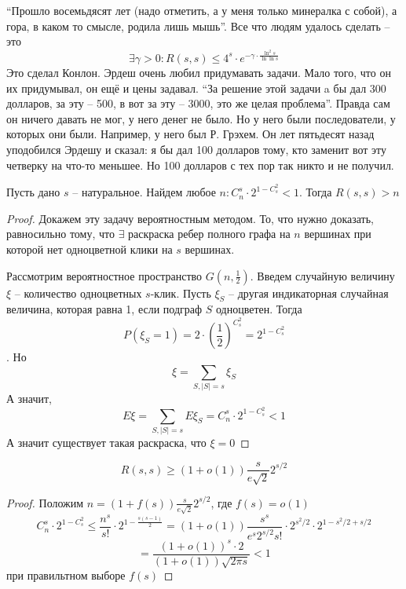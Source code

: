 \documentclass[document.tex]{subfiles}
\begin{document}
\begin{remark}
	``Прошло восемьдясят лет (надо отметить, а у меня только минералка с собой), а гора, в каком то смысле, родила лишь мышь''. Все что людям удалось сделать -- это $$\exists \gamma > 0 : R(s, s) \leq 4^s \cdot e^{-\gamma \cdot \frac{\ln^2 s}{\ln \ln s}}$$ Это сделал Конлон. Эрдеш очень любил придумавать задачи. Мало того, что он их придумывал, он ещё и цены задавал. ``За решение этой задачи a бы дал 300 долларов, за эту -- 500, в вот за эту -- 3000, это же целая проблема''. Правда сам он ничего давать не мог, у него денег не было. Но у него были последователи, у которых они были. Например, у него был Р. Грэхем. Он лет пятьдесят назад уподобился Эрдешу и сказал: я бы дал 100 долларов тому, кто заменит вот эту четверку на что-то меньшее. Но 100 долларов с тех пор так никто и не получил.
\end{remark}

\begin{theorem}
	Пусть дано $s$ -- натуральное. Найдем любое $\displaystyle n: C^s_n \cdot 2^{1-C_s^2} < 1$. Тогда $R(s, s) > n$
\end{theorem}

\begin{proof}
	Докажем эту задачу вероятностным методом. То, что нужно доказать, равносильно тому, что $\exists$ раскраска ребер полного графа на $n$ вершинах при которой нет одноцветной клики на $s$ вершинах.

	Рассмотрим вероятностное пространство $G(n, \frac{1}{2})$. 
	Введем случайную величину $\xi$ -- количество одноцветных $s$-клик. Пусть $\xi_S$ -- другая индикаторная случайная величина, которая равна 1, если подграф $S$ одноцветен. Тогда $$P(\xi_S = 1) = 2 \cdot \left(\frac{1}{2}\right)^{C_s^2} = 2^{1-C_s^2}$$. Но $$\xi = \sum_{S, |S| = s} \xi_S$$ А значит, 
	$$E\xi = \sum_{S, |S| = s} E\xi_S = C_n^s \cdot 2^{1-C_s^2} < 1$$
	А значит существует такая раскраска, что $\xi = 0$
\end{proof}

\begin{corollary}
	$$R(s, s) \geq (1+o(1))\frac{s}{e\sqrt{2}} 2^{s/2}$$
\end{corollary}
\begin{proof}
	Положим $n = (1+f(s)) \frac{s}{e\sqrt{2}}2^{s/2}$, где $f(s) = o(1)$
	$$C_n^s \cdot 2^{1 - C_s^2} \leq \frac{n^s}{s!} \cdot 2^{1 - \frac{s(s-1)}{2}} = (1+o(1)) \frac{s^s}{e^s 2^{s/2}s!} \cdot 2^{s^2/2} \cdot 2^{1 - s^2/2 + s/2}$$
	$$= \frac{(1 + o(1))^s \cdot 2}{(1+o(1)) \sqrt{2 \pi s}} < 1$$
	при правильтном выборе $f(s)$

\end{proof}
\end{document}
